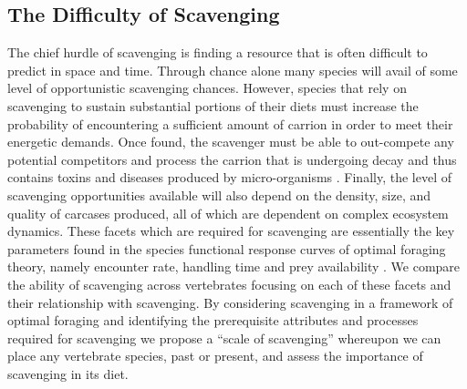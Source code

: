\documentclass[a4paper,12pt]{article}
\begin{document}

\subsection*{The Difficulty of Scavenging}
The chief hurdle of scavenging is finding a resource that is often difficult to predict in space and time.
Through chance alone many species will avail of some level of opportunistic scavenging chances. %
However, species that rely on scavenging to sustain substantial portions of their diets must increase the probability of encountering a sufficient amount of carrion in order to meet their energetic demands.
Once found, the scavenger must be able to out-compete any potential competitors and process the carrion that is undergoing decay and thus contains toxins and diseases produced by micro-organisms \citep{ruxton2014fruit}.
Finally, the level of scavenging opportunities available will also depend on the density, size, and quality of carcases produced, all of which are dependent on complex ecosystem dynamics.
These facets which are required for scavenging are essentially the key parameters found in the species functional response curves of optimal foraging theory, namely encounter rate, handling time and prey availability \citep{jeschke2002predator}. %
We compare the ability of scavenging across vertebrates focusing on each of these facets and their relationship with scavenging.
By considering scavenging in a framework of optimal foraging and identifying the prerequisite attributes and processes required for scavenging we propose a ``scale of scavenging'' whereupon we can place any vertebrate species, past or present, and assess the importance of scavenging in its diet. 
\end{document}
